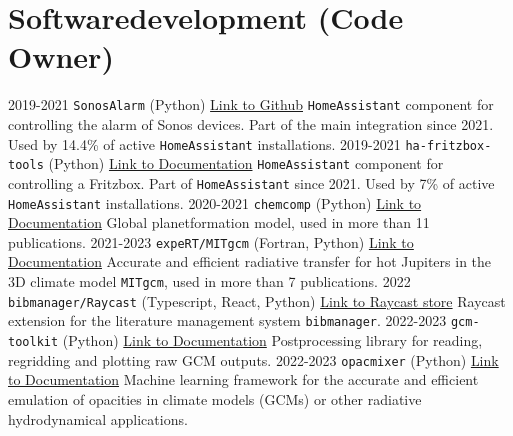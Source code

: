 \documentclass[]{friggeri-cv}
\begin{document}
\section{Softwaredevelopment (Code Owner)}
\begin{entrylist}
  \entry
    {2019-2021}
    {\texttt{SonosAlarm} (Python)}
    {\href{https://github.com/AaronDavidSchneider/SonosAlarm}{Link to Github}}
    {\texttt{HomeAssistant} component for controlling the alarm of Sonos devices. Part of the main integration since 2021. Used by 14.4\% of active \texttt{HomeAssistant} installations.}   
  \entry
    {2019-2021}
    {\texttt{ha-fritzbox-tools} (Python)}
    {\href{https://www.home-assistant.io/integrations/fritz/}{Link to Documentation}}
    {\texttt{HomeAssistant} component for controlling a Fritzbox. Part of \texttt{HomeAssistant} since 2021. Used by 7\% of active \texttt{HomeAssistant} installations.}       
  \entry
    {2020-2021}
    {\texttt{chemcomp} (Python)}
    {\href{https://chemcomp.readthedocs.io/en/latest/}{Link to Documentation}}
    {Global planetformation model, used in more than 11 publications.}    
  \entry
    {2021-2023}
    {\texttt{expeRT/MITgcm} (Fortran, Python)}
    {\href{https://exorad.readthedocs.io/en/latest/}{Link to Documentation}}
    {Accurate and efficient radiative transfer for hot Jupiters in the 3D climate model \texttt{MITgcm}, used in more than 7 publications.}   
  \entry
    {2022}
    {\texttt{bibmanager/Raycast} (Typescript, React, Python)}
    {\href{https://www.raycast.com/aaronschneider/bibmanager}{Link to Raycast store}}
    {Raycast extension for the literature management system \texttt{bibmanager}.}          
  \entry
    {2022-2023}
    {\texttt{gcm-toolkit} (Python)}
    {\href{https://gcm-toolkit.readthedocs.io/en/latest/}{Link to Documentation}}
    {Postprocessing library for reading, regridding and plotting raw GCM outputs.}          
  \entry
    {2022-2023}
    {\texttt{opacmixer} (Python)}
    {\href{https://opacmixer.readthedocs.io/en/latest/}{Link to Documentation}}
    {Machine learning framework for the accurate and efficient emulation of opacities in climate models (GCMs) or other radiative hydrodynamical applications.}      
\end{entrylist}

\newpage
\end{document}
